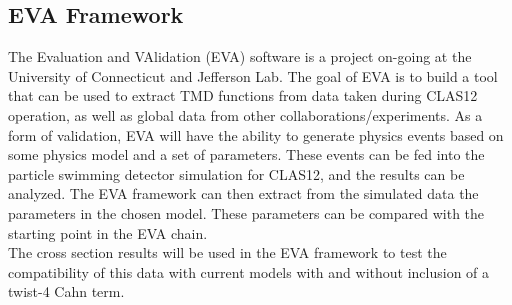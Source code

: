 \subsection{EVA Framework}
The Evaluation and VAlidation (EVA) software is a project on-going at the University of Connecticut and Jefferson Lab.  The goal of EVA is to build a tool that can be used to extract TMD functions from data taken during CLAS12 operation, as well as global data from other collaborations/experiments.  As a form of validation, EVA will have the ability to generate physics events based on some physics model and a set of parameters.  These events can be fed into the particle swimming detector simulation for CLAS12, and the results can be analyzed.  The EVA framework can then extract from the simulated data the parameters in the chosen model.  These parameters can be compared with the starting point in the EVA chain. \\

The cross section results will be used in the EVA framework to test the compatibility of this data with current models with and without inclusion of a twist-4 Cahn term.

